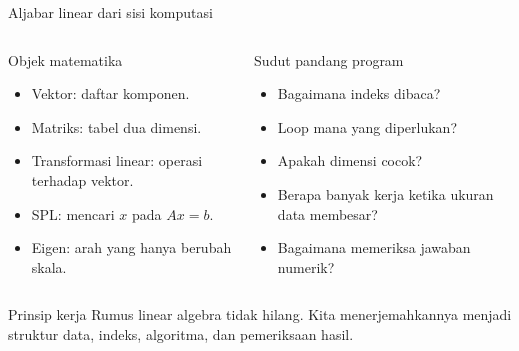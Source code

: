 \documentclass[aspectratio=169,11pt]{beamer}
\begin{document}
\begin{frame}{Aljabar linear dari sisi komputasi}
\begin{columns}[T]
\begin{block}{Objek matematika}
\small
\begin{itemize}
  \item Vektor: daftar komponen.
  \item Matriks: tabel dua dimensi.
  \item Transformasi linear: operasi terhadap vektor.
  \item SPL: mencari $x$ pada $Ax=b$.
  \item Eigen: arah yang hanya berubah skala.
\end{itemize}
\end{block}
\begin{block}{Sudut pandang program}
\small
\begin{itemize}
  \item Bagaimana indeks dibaca?
  \item Loop mana yang diperlukan?
  \item Apakah dimensi cocok?
  \item Berapa banyak kerja ketika ukuran data membesar?
  \item Bagaimana memeriksa jawaban numerik?
\end{itemize}
\end{block}
\end{columns}
\vspace{2mm}
\begin{alertblock}{Prinsip kerja}
Rumus linear algebra tidak hilang. Kita menerjemahkannya menjadi struktur data, indeks, algoritma, dan pemeriksaan hasil.
\end{alertblock}
\end{frame}
\end{document}
